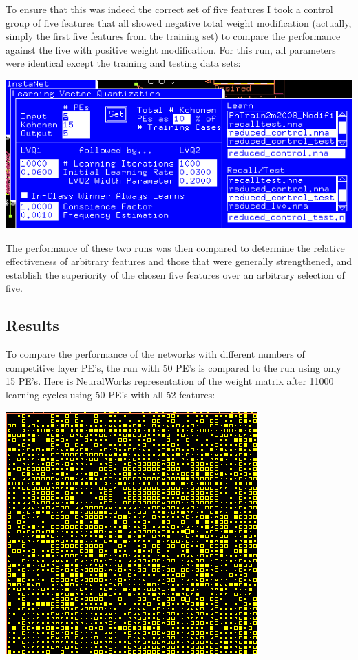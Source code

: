 \documentclass[12pt]{article}
\begin{document}
To ensure that this was indeed the correct set of five features I took a control group of five features that all showed negative total weight modification (actually, simply the first five features from the training set) to compare the performance against the five with positive weight modification.  For this run, all parameters were identical except the training and testing data sets:

\begin{center}
\includegraphics[scale=0.7]{parameters5control.png}
\end{center}

The performance of these two runs was then compared to determine the relative effectiveness of arbitrary features and those that were generally strengthened, and establish the superiority of the chosen five features over an arbitrary selection of five.  

\subsection{Results}

To compare the performance of the networks with different numbers of competitive layer PE's, the run with 50 PE's is compared to the run using only 15 PE's.  Here is NeuralWorks representation of the weight matrix after 11000 learning cycles using 50 PE's with all 52 features:

\begin{center}
\includegraphics[scale=0.8]{52f50kweights.png}
\end{center}
\end{document}
